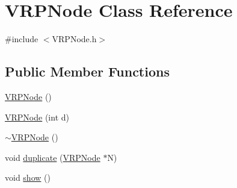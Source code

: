 \hypertarget{class_v_r_p_node}{
\section{VRPNode Class Reference}
\label{class_v_r_p_node}
}


{\ttfamily \#include $<$VRPNode.h$>$}

\subsection*{Public Member Functions}
\begin{DoxyCompactItemize}
\item 
\hyperlink{class_v_r_p_node_a7f4f1d4221cf958a36aa5190ad602e8a}{VRPNode} ()
\item 
\hyperlink{class_v_r_p_node_a8e7685da26e9cd23f2109b5665cccb1e}{VRPNode} (int d)
\item 
\hyperlink{class_v_r_p_node_a6eb14de9dd05216bbefcab0b71f11bc2}{$\sim$VRPNode} ()
\item 
void \hyperlink{class_v_r_p_node_abf9104e61c21ae9b104ad63c3e9ecfdc}{duplicate} (\hyperlink{class_v_r_p_node}{VRPNode} $\ast$N)
\item 
void \hyperlink{class_v_r_p_node_afe32de78fd5625870f25ddb5ae6350e4}{show} ()
\end{DoxyCompactItemize}
